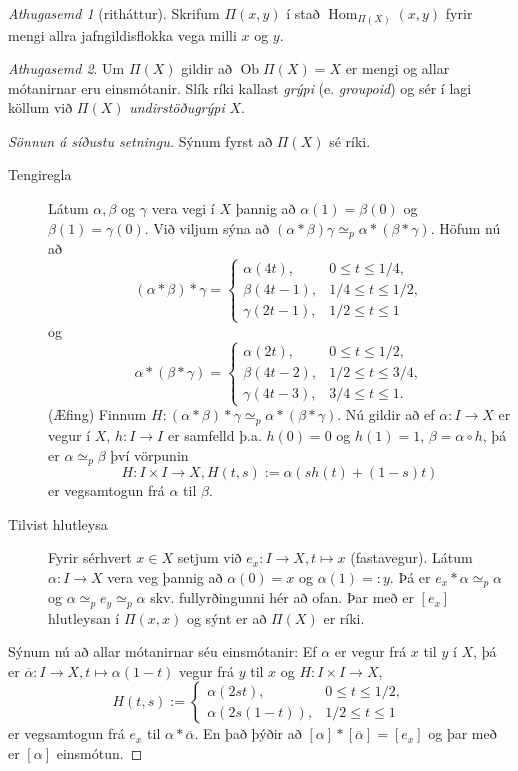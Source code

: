 \documentclass[a4paper,icelandic]{book}
\theoremstyle{definition}
\theoremstyle{plain}
\theoremstyle{remark}
\newtheorem*{ath}{Athugasemd}
\DeclareMathOperator{\Ob}{Ob}
\DeclareMathOperator{\Hom}{Hom}
\begin{document}
\begin{ath}
  [ritháttur]
  Skrifum $\Pi(x,y)$ í stað $\Hom_{\Pi(X)}(x,y)$ fyrir mengi allra
  jafngildisflokka vega milli $x$ og $y$.
\end{ath}
\begin{ath}
  Um $\Pi(X)$ gildir að $\Ob\Pi(X)=X$ er mengi og allar mótanirnar eru
  einsmótanir. Slík ríki kallast \emph{grýpi} (e.
  \emph{groupoid}) og sér í lagi köllum við $\Pi(X)$
  \emph{undirstöðugrýpi} $X$. 
\end{ath}
\begin{proof}
  [Sönnun á síðustu setningu]
  Sýnum fyrst að $\Pi(X)$ sé ríki.
  \begin{description}
    \item[Tengiregla] Látum $\alpha,\beta$ og $\gamma$ vera vegi í $X$
      þannig að $\alpha(1)=\beta(0)$ og $\beta(1)=\gamma(0)$. Við viljum
      sýna að $(\alpha*\beta)\gamma\simeq_p\alpha*(\beta*\gamma)$. Höfum
      nú að \[
      (\alpha*\beta)*\gamma =
      \begin{cases}
        \alpha(4t),   & 0\leq   t\leq 1/4,\\
        \beta(4t-1),  & 1/4\leq t\leq 1/2,\\
        \gamma(2t-1), & 1/2\leq t\leq 1
      \end{cases}
      \]
      og \[
      \alpha*(\beta*\gamma) = 
      \begin{cases}
        \alpha(2t),   & 0\leq t\leq 1/2,\\
        \beta(4t-2),  & 1/2\leq t\leq 3/4,\\
        \gamma(4t-3), & 3/4\leq t\leq 1.
      \end{cases}
      \]
      (Æfing) Finnum
      $H:(\alpha*\beta)*\gamma\simeq_p\alpha*(\beta*\gamma)$. Nú gildir
      að ef $\alpha:I\to X$ er vegur í $X$, $h:I\to I$ er samfelld þ.a.
      $h(0)=0$ og $h(1)=1$, $\beta=\alpha\circ h$, þá er
      $\alpha\simeq_p\beta$ því vörpunin 
      \[
      H:I\times I\to X, 
      H(t,s):= \alpha(sh(t)+(1-s)t)
      \]
      er vegsamtogun frá $\alpha$ til $\beta$.
    \item[Tilvist hlutleysa] Fyrir sérhvert $x\in X$ setjum við
      $e_x:I\to X,t\mapsto x$ (fastavegur). Látum $\alpha:I\to X$ vera
      veg þannig að $\alpha(0)=x$ og $\alpha(1)=:y$. Þá er
      $e_x*\alpha\simeq_p\alpha$ og $\alpha\simeq_p e_y\simeq_p \alpha$
      skv. fullyrðingunni hér að ofan. Þar með er $[e_x]$ hlutleysan í
      $\Pi(x,x)$ og sýnt er að $\Pi(X)$ er ríki. 
  \end{description}
  Sýnum nú að allar mótanirnar séu einsmótanir: Ef $\alpha$ er vegur frá
  $x$ til $y$ í $X$, þá er $\overline\alpha:I\to X, t\mapsto\alpha(1-t)$
  vegur frá $y$ til $x$ og $H:I\times I\to X$,
  \[
  H(t,s) := 
  \begin{cases}
    \alpha(2st),      & 0\leq t \leq 1/2, \\
    \alpha(2s(1-t)),  & 1/2\leq t\leq 1
  \end{cases}
  \]
  er vegsamtogun frá $e_x$ til $\alpha*\overline\alpha$. En það þýðir að
  $[\alpha]*[\overline\alpha]=[e_x]$ og þar með er $[\alpha]$ einsmótun.
\end{proof}
\end{document}
